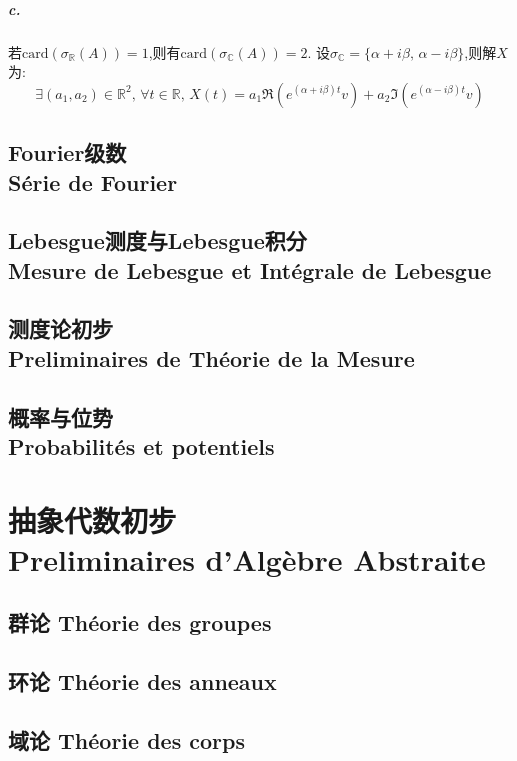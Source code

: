 \documentclass[12pt, a4paper, oneside]{ctexbook}
\newcommand{\card }{\text{card}}%
\newcommand{\R }{\mathbb{R}}%
\renewcommand{\S}{\mathcal{S}}%
\newcommand{\Com }{\mathbb{C}}%
\begin{document}
  \subsubsection{c.}
  若$\card(\sigma_\R(A))=1$,则有$\card(\sigma_\Com(A))=2$.
  设$\sigma_\Com=\{\alpha+i\beta,\,\alpha-i\beta\}$,则解$X$为:
  $$
    \exists(a_1,a_2)\in\R^2,\,\forall t\in\R,\,X(t)=a_1\Re(e^{(\alpha+i\beta)t}v)+a_2\Im(e^{(\alpha-i\beta)t}v)
  $$












  \chapter{Fourier级数\\Série de Fourier}

  \chapter{Lebesgue测度与Lebesgue积分\\ Mesure de Lebesgue et Intégrale de Lebesgue}

  \chapter{测度论初步\\Preliminaires de Théorie de la Mesure}

  \chapter{概率与位势\\ Probabilités et potentiels}  

  \part{抽象代数初步 \\Preliminaires d'Algèbre Abstraite}
  \chapter{群论 Théorie des groupes}
  \chapter{环论 Théorie des anneaux}
  \chapter{域论 Théorie des corps}
\end{document}
